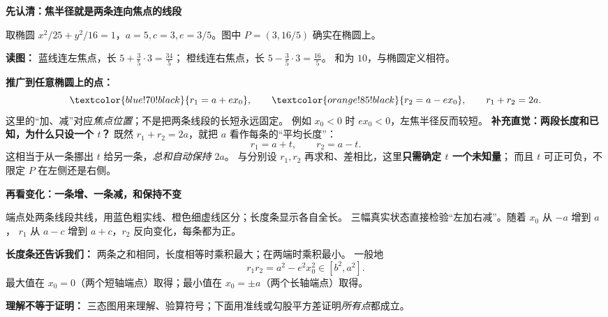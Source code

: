 \clearpage
\begin{explanationbox}
\textbf{\textcolor{CExplanation}{先认清：焦半径就是两条连向焦点的线段}}

取椭圆 $x^2/25+y^2/16=1$，$a=5,c=3,e=3/5$。图中 $P=(3,16/5)$ 确实在椭圆上。

\textbf{读图：} 蓝线连左焦点，长 $5+\frac35\cdot3=\frac{34}{5}$；
橙线连右焦点，长 $5-\frac35\cdot3=\frac{16}{5}$。
和为 $10$，与椭圆定义相符。

\textbf{推广到任意椭圆上的点：}
\[
\textcolor{blue!70!black}{r_1=a+ex_0},\qquad
\textcolor{orange!85!black}{r_2=a-ex_0},\qquad r_1+r_2=2a.
\]
这里的“加、减”对应\emph{焦点位置}；不是把两条线段的长短永远固定。
例如 $x_0<0$ 时 $ex_0<0$，左焦半径反而较短。
\medskip
\textbf{\textcolor{CExplanation}{补充直觉：两段长度和已知，为什么只设一个 $t$？}}
既然 $r_1+r_2=2a$，就把 $a$ 看作每条的“平均长度”：
\[
 \boxed{r_1=a+t,\qquad r_2=a-t.}
\]
这相当于从一条挪出 $t$ 给另一条，\emph{总和自动保持 $2a$}。
与分别设 $r_1,r_2$ 再求和、差相比，这里\textbf{只需确定 $t$ 一个未知量}；
而且 $t$ 可正可负，不限定 $P$ 在左侧还是右侧。
\end{explanationbox}
\clearpage
\begin{explanationbox}
\textbf{\textcolor{CExplanation}{再看变化：一条增、一条减，和保持不变}}

端点处两条线段共线，用蓝色粗实线、橙色细虚线区分；长度条显示各自全长。
三幅真实状态直接检验“左加右减”。随着 $x_0$ 从 $-a$ 增到 $a$，
$r_1$ 从 $a-c$ 增到 $a+c$，$r_2$ 反向变化，每条都为正。

\textbf{长度条还告诉我们：} 两条之和相同，长度相等时乘积最大；在两端时乘积最小。
一般地
\[
r_1r_2=a^2-e^2x_0^2\in[b^2,a^2].
\]
最大值在 $x_0=0$（两个短轴端点）取得；最小值在 $x_0=\pm a$（两个长轴端点）取得。

\textbf{理解不等于证明：} 三态图用来理解、验算符号；下面用准线或勾股平方差证明\emph{所有点}都成立。
\end{explanationbox}
